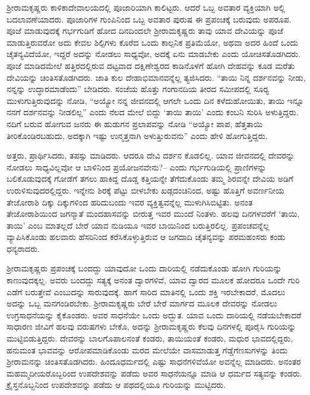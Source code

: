 ಶ‍್ರೀರಾಮಕೃಷ್ಣರು ಕಾಳಿಕಾದೇವಾಲಯದಲ್ಲಿ ಪೂಜಾರಿಯಾಗಿ ಕಾಲಿಟ್ಟರು. ಆದರೆ ಒಬ್ಬ ಅವತಾರ ವ್ಯಕ್ತಿಯಾಗಿ ಅಲ್ಲಿ ಬದಲಾವಣೆಯಾದರು. ಪೂಜಾರಿಗಳ ಗುಂಪಿನಿಂದ ಒಬ್ಬ ಅವತಾರ ಪುರುಷ ಈ ಪ್ರಪಂಚಕ್ಕೆ ಬರುವುದು ಅಪರೂಪ. ಪೂಜೆ ಮಾಡುವುದಕ್ಕೆ ಗರ್ಭಗುಡಿಗೆ ಹೋದ ದಿನದಿಂದಲೇ ಶ‍್ರೀರಾಮಕೃಷ್ಣರು ತಾವು ಯಾವ ದೇವಿಯನ್ನು ಪೂಜೆ ಮಾಡುತ್ತಿರುವರೋ ಅದು ಕೇವಲ ಶಿಲ್ಪಿಗಳು ಕೊರೆದ ಒಂದು ಕಾಲ್ಪನಿಕ ಪ್ರತಿಮೆಯೋ, ಅಥವಾ ಅದರ ಹಿಂದೆ ಒಂದು ಚೈತನ್ಯವಿದೆಯೋ, ಇದ್ದರೆ ಅದನ್ನು ನೋಡಲು ಸಾಧ್ಯವೋ, ಅದಕ್ಕೆ ಏನು ಮಾಡಬೇಕು ಎಂದು ಯೋಚಿಸತೊಡಗಿದರು. ಪೂಜೆ ಮಾಡಿದಮೇಲೆ ಹತ್ತಿರದಲ್ಲಿರುವ ದಟ್ಟವಾದ ದಕ್ಷಿಣೇಶ್ವರದ ಕಾಡಿನೊಳಗೆ ಹೋಗಿ ದೇಹವನ್ನು ಕೂಡ ಮರೆತು ದೇವಿಯನ್ನು ಚಿಂತಿಸತೊಡಗಿದರು. ಜಾತಿ ಕುಲ ದೇಹಾಭಿಮಾನವನ್ನೆಲ್ಲ ತ್ಯಜಿಸಿದರು. “ತಾಯಿ ನಿನ್ನ ದರ್ಶನವನ್ನು ನೀಡು, ನನ್ನನ್ನು ಉದ್ಧಾರಮಾಡೆಂದು” ಬೇಡಿದರು. ಸಂಜೆಯ ಹೊತ್ತು ಗಂಗಾನದಿಯ ತೀರದ ಸಮೀಪದಲ್ಲಿ ಸೂರ‍್ಯ ಮುಳುಗುತ್ತಿರುವುದನ್ನು ನೋಡಿ, “ಅಯ್ಯೋ ನನ್ನ ಜೀವನದಲ್ಲಿ ಆಗಲೇ ಒಂದು ದಿನ ಕಳೆದುಹೋಯಿತು, ತಾಯಿ ಇನ್ನೂ ನನಗೆ ದರ್ಶನವನ್ನು ನೀಡಲಿಲ್ಲ” ಎಂದು ನೆಲದ ಮೇಲೆ ಬಿದ್ದು ‘ತಾಯಿ ತಾಯಿ’ ಎಂದು ಕಂಬನಿ ಸುರಿಸಿ ಅಳುತ್ತಿದ್ದರು. ನದಿಗೆ ಬರುವ ಹೋಗುವ ಜನರು ಈ ಹುಡುಗನ ಪ್ರಲಾಪವನ್ನು ನೋಡಿ “ಅಯ್ಯೋ ಪಾಪ, ಹೆತ್ತತಾಯಿ ತೀರಿಕೊಂಡಿರಬಹುದು, ಅದಕ್ಕಾಗಿ ಇಷ್ಟು ಉನ್ಮತ್ತನಾಗಿ ಅಳುತ್ತಿುರುವನು” ಎಂದು ಹೇಳಿ ಹೋಗುತ್ತಿದ್ದರು.

ಅತ್ತರು, ಪ್ರಾರ್ಥಿಸಿದರು, ತಪಸ್ಸು ಮಾಡಿದರು. ಆದರೂ ದೇವಿ ದರ್ಶನ ಕೊಡಲಿಲ್ಲ. ಯಾವ ಜೀವನದಲ್ಲಿ ದೇವರನ್ನು ನೋಡಲು ಸಾಧ್ಯವಿಲ್ಲವೋ ಆ ಬಾಳಿನಿಂದ ಪ್ರಯೋಜನವೇನು?– ಎಂದು ಗರ್ಭಗುಡಿಯಲ್ಲಿ ಪ್ರಾಣಿಗಳನ್ನು ಬಲಿಕೊಡುವುದಕ್ಕೆ ಗೋಡೆಗೆ ತಗಲು ಹಾಕಿದ್ದ ದೊಡ್ಡ ಕತ್ತಿಯನ್ನೇ ತೆಗೆದುಕೊಂಡು ತಮ್ಮ ಶಿರವನ್ನೇ ದೇವಿಯ ಅಡಿಗೆ ಉರುಳಿಸುವುದರಲ್ಲಿದ್ದರು. ಇನ್ನೇನು ಶಿರಕ್ಕೆ ಪೆಟ್ಟು ಬೀಳಬೇಕು ಖಡ್ಗದಂಚಿನಿಂದ, ಅಷ್ಟು ಹೊತ್ತಿಗೆ ಅವರ್ಣನೀಯ ತೇಜೋರಾಶಿ ದಿಕ್ಕು ದಿಕ್ಕುಗಳಿಂದ ಹರಿದುಬಂದು ಇವರ ವ್ಯಕ್ತಿತ್ವವನ್ನೆಲ್ಲ ಮುಳುಗಿಸಿಬಿಟ್ಟಿತು. ಅನಂತ ತೇಜೋರಾಶಿಯಿಂದ ಜಗನ್ಮಾತೆ ಮಂದಹಾಸವನ್ನು ಬೀರುತ್ತ ಇವರ ಮುಂದೆ ನಿಂತಳು. ಹಲವು ದಿನಗಳವರೆಗೆ ‘ತಾಯಿ, ತಾಯಿ’ ಎಂಬ ಮಾತಲ್ಲದೆ ಬೇರೆ ಯಾವ ನುಡಿಯೂ ಇವರ ಬಾಯಿನಿಂದ ಬರುತ್ತಿರಲಿಲ್ಲ. ಪ್ರಪಂಚವನ್ನೆಲ್ಲ ವ್ಯಾಪಿಸಿಕೊಂಡು ಹಲವಾರು ಹೆಸರಿನಿಂದ ಕರೆಸಿಕೊಳ್ಳುತ್ತಿರುವ ಆ ಜಗದಾದಿ ಚೈತನ್ಯವನ್ನು ಪರಮಹಂಸರು ಕಂಡು ಧನ್ಯರಾದರು.

ಶ‍್ರೀರಾಮಕೃಷ್ಣರು ಪ್ರಪಂಚಕ್ಕೆ ಬಂದದ್ದು ಯಾವುದೋ ಒಂದು ದಾರಿಯಲ್ಲಿ ನಡೆದುಕೊಂಡು ಹೋಗಿ ಗುರಿಯನ್ನು ಕಾಣುವುದಕ್ಕಲ್ಲ. ಅವರು ಬಂದದ್ದು ಸತ್ಯಕ್ಕೆ ಅನಂತ ದ್ವಾರಗಳಿವೆ, ಯಾವ ದ್ವಾರದ ಮೂಲಕ ಹೋದರೂ ಒಂದೇ ಗುರಿ ಎಡೆಗೆ ಬರುತ್ತೇವೆ ಎಂಬುದನ್ನು ಸಾರುವುದಕ್ಕೆ. ಹಾಗೆ ಸಾರಿದ ಮಾತಿನಲ್ಲಿ ಒಂದು ಶಕ್ತಿ ಇರಬೇಕಾದರೆ, ಮೊದಲು ಅದನ್ನು ಒಬ್ಬ ಮನಗಂಡಿರಬೇಕು. ಶ‍್ರೀರಾಮಕೃಷ್ಣರು ಬೇರೆ ಬೇರೆ ಮಾರ್ಗದ ಮೂಲಕ ದೇವರನ್ನು ನೋಡಲು ಉಗ್ರಸಾಧನೆಯನ್ನು ಕೈಕೊಂಡರು. ಅವರ ಸಾಧನೆಯೇ ಒಂದು ಅದ್ಭುತ. ಯಾವ ಒಂದು ದಾರಿಯಲ್ಲಿ ನಡೆಯಬೇಕಾದರೆ ಸಾಧಾರಣ ಜೀವಿಗೆ ಹಲವು ವರುಷಗಳು ಬೇಕೊ, ಅದನ್ನು ಶ‍್ರೀರಾಮಕೃಷ್ಣರು ಕೆಲವು ದಿನಗಳಲ್ಲಿ ಪೂರೈಸಿ ಗುರಿಯನ್ನು ಮುಟ್ಟಿಬಿಡುತ್ತಿದ್ದರು. ದೇವರನ್ನು ಬಾಲಗೊಪಾಲನಂತೆ ಕಂಡರು, ತಾಯಿಯಂತೆ ಕಂಡರು, ಮಧುರ ಭಾವದಲ್ಲಿದ್ದರು, ಹನುಮಂತ ಭಾವವನ್ನು ಆರೋಪಮಾಡಿಕೊಂಡು ಮರದ ಮೇಲೆಯೇ ವಾಸಮಾಡುತ್ತ ಗೆಡ್ಡೆಗೆಣಸುಗಳನ್ನು ತಿಂದು ಶ‍್ರೀರಾಮನನ್ನು ಚಿಂತಿಸತೊಡಗಿದರು. ಹಿಂದೂಧರ್ಮದಲ್ಲಿ ಎಷ್ಟು ಸಾಧನೆಗಳಿವೆಯೋ ಅವನ್ನೆಲ್ಲ ಮಾಡಿದರು. ಅನಂತರ ಮಹಮ್ಮದೀಯರೊಬ್ಬರಿಂದ ಉಪದೇಶವನ್ನು ಪಡೆದು ಅವರ ಸಾಧನೆಯನ್ನೂ ಮಾಡಿ ಆ ಧರ್ಮದ ಸತ್ಯವನ್ನು ಕಂಡರು. ಕ್ರೈಸ್ತನೊಬ್ಬನಿಂದ ಉಪದೇಶವನ್ನು ಪಡೆದು ಆ ಪಥದಲ್ಲಿಯೂ ಗುರಿಯನ್ನು ಮುಟ್ಟಿದರು.

